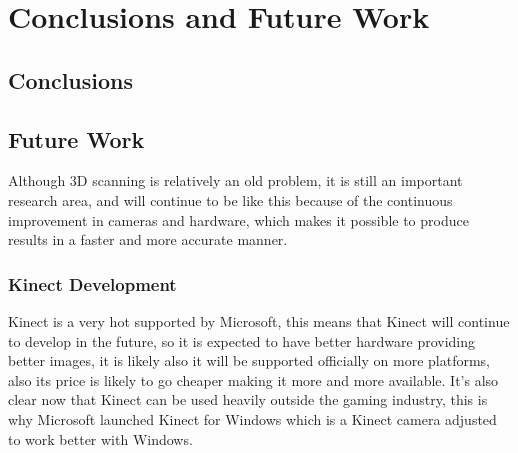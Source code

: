 \chapter{Conclusions and Future Work}

\section{Conclusions}


\section{Future Work}

Although 3D scanning is relatively an old problem, it is still an important research area, and will continue to be like this because of the continuous improvement in cameras and hardware, which makes it possible to produce results in a faster and more accurate manner.


\subsection{Kinect Development}
Kinect is a very hot supported by Microsoft, this means that Kinect will continue to develop in the future, so it is expected to have better hardware providing better images, it is likely also it will be supported officially on more platforms, also its price is likely to go cheaper making it more and more available.
It's also clear now that Kinect can be used heavily outside the gaming industry, this is why Microsoft launched Kinect for Windows which is a Kinect camera adjusted to work better with Windows.


